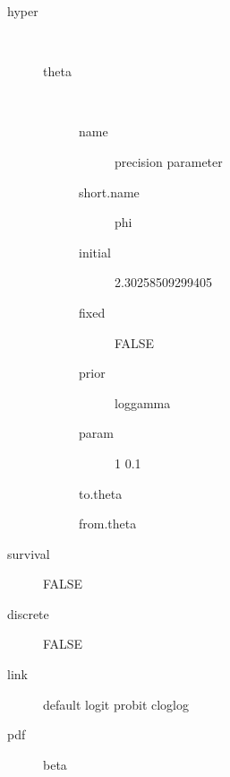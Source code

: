 \begin{description}
	\item[hyper]\ 
	 \begin{description}
	 	\item[theta]\ 
	 	 \begin{description}
	 	 	 \item[ name ] precision parameter 
	 	 	 \item[ short.name ] phi 
	 	 	 \item[ initial ] 2.30258509299405 
	 	 	 \item[ fixed ] FALSE 
	 	 	 \item[ prior ] loggamma 
	 	 	 \item[ param ] 1 0.1 
	 	 	 \item[ to.theta ] \verb|| 
	 	 	 \item[ from.theta ] \verb|| 
	 	 \end{description}
	 \end{description}
	 \item[ survival ] FALSE 
	 \item[ discrete ] FALSE 
	 \item[ link ] default logit probit cloglog 
	 \item[ pdf ] beta 
\end{description}
